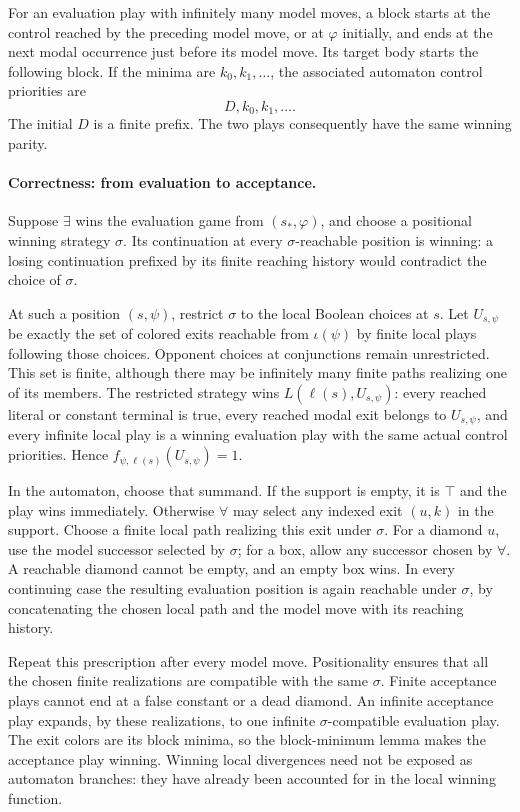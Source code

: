 For an evaluation play with infinitely many
model moves, a block starts at the control
reached by the preceding model move, or at
\(\varphi\) initially, and ends at the next
modal occurrence just before its model move.
Its target body starts the following block.
If the minima are \(k_0,k_1,\ldots\), the
associated automaton control priorities are
\[
 D,k_0,k_1,\ldots.
\]
The initial \(D\) is a finite prefix.
The two plays consequently have the same
winning parity.

\paragraph{Correctness: from evaluation to acceptance.}
Suppose \(\exists\) wins the evaluation game
from \((s_*,\varphi)\), and choose a positional
winning strategy \(\sigma\). Its continuation
at every \(\sigma\)-reachable position is
winning: a losing continuation prefixed by
its finite reaching history would contradict
the choice of \(\sigma\).

At such a position \((s,\psi)\), restrict
\(\sigma\) to the local Boolean choices at
\(s\). Let \(U_{s,\psi}\) be exactly the set
of colored exits reachable from \(\iota(\psi)\)
by finite local plays following those choices.
Opponent choices at conjunctions remain
unrestricted. This set is finite, although
there may be infinitely many finite paths
realizing one of its members.
The restricted strategy wins
\(L(\ell(s),U_{s,\psi})\): every reached
literal or constant terminal is true, every reached
modal exit belongs to \(U_{s,\psi}\), and
every infinite local play is a winning
evaluation play with the same actual
control priorities. Hence
\(f_{\psi,\ell(s)}(U_{s,\psi})=1\).

In the automaton, choose that summand.
If the support is empty, it is \(\top\)
and the play wins immediately.
Otherwise \(\forall\) may select any
indexed exit \((u,k)\) in the support.
Choose a finite local path realizing
this exit under \(\sigma\).
For a diamond \(u\), use the model
successor selected by \(\sigma\);
for a box, allow any successor chosen
by \(\forall\). A reachable diamond
cannot be empty, and an empty box wins.
In every continuing case the resulting
evaluation position is again reachable
under \(\sigma\), by concatenating the
chosen local path and the model move
with its reaching history.

Repeat this prescription after every
model move. Positionality ensures that
all the chosen finite realizations are
compatible with the same \(\sigma\).
Finite acceptance plays cannot end at
a false constant or a dead diamond.
An infinite acceptance play expands,
by these realizations, to one infinite
\(\sigma\)-compatible evaluation play.
The exit colors are its block minima,
so the block-minimum lemma makes the
acceptance play winning. Winning local
divergences need not be exposed as
automaton branches: they have already
been accounted for in the local
winning function.

